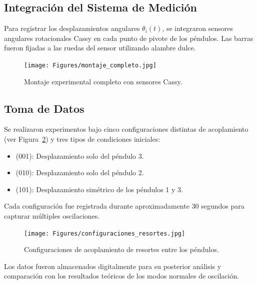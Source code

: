 \subsection{Integración del Sistema de Medición}

Para registrar los desplazamientos angulares $\theta_i(t)$, se integraron sensores angulares rotacionales Cassy en cada punto de pivote de los péndulos. Las barras fueron fijadas a las ruedas del sensor utilizando alambre dulce.

\begin{figure}[h!]
    \centering
    \texttt{[image: Figures/montaje\_completo.jpg]}
    \caption{Montaje experimental completo con sensores Cassy.}
    \label{fig:montaje}
\end{figure}

\subsection{Toma de Datos}

Se realizaron experimentos bajo cinco configuraciones distintas de acoplamiento (ver Figura~\ref{fig:configuraciones}) y tres tipos de condiciones iniciales:

\begin{itemize}
    \item (001): Desplazamiento solo del péndulo 3.
    \item (010): Desplazamiento solo del péndulo 2.
    \item (101): Desplazamiento simétrico de los péndulos 1 y 3.
\end{itemize}

Cada configuración fue registrada durante aproximadamente 30 segundos para capturar múltiples oscilaciones.

\begin{figure}[h!]
    \centering
    \texttt{[image: Figures/configuraciones\_resortes.jpg]}
    \caption{Configuraciones de acoplamiento de resortes entre los péndulos.}
    \label{fig:configuraciones}
\end{figure}

Los datos fueron almacenados digitalmente para su posterior análisis y comparación con los resultados teóricos de los modos normales de oscilación.
